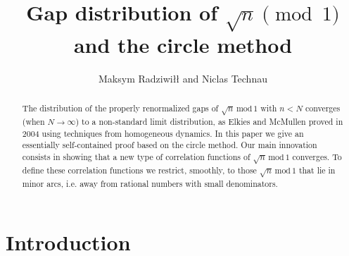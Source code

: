\documentclass[12pt,reqno]{amsart}
\theoremstyle{plain}
\numberwithin{equation}{section}
\numberwithin{figure}{section}
\theoremstyle{plain}
\theoremstyle{definition}
\theoremstyle{remark}
\newcommand{\mmod}{\,\mathrm{mod}\,}
\begin{document}
\title{Gap distribution of $\sqrt{n} \pmod {1}$ and the circle method}
 \author{Maksym Radziwi\l{}\l{} and Niclas Technau}


 \begin{abstract} 
  The distribution of the properly 
  renormalized gaps of 
  $\sqrt{n} \mmod{1}$ with $n < N$
  converges (when $N\rightarrow \infty$)
  to a non-standard limit distribution, 
  as Elkies and McMullen proved in 2004
  using techniques from homogeneous dynamics. 
  In this paper we give an essentially 
  self-contained proof based on the circle method. 
  Our main innovation
  consists in showing that a new
  type of correlation functions of 
  $\sqrt{n} \mmod{1}$
  converges. To define these 
  correlation functions we restrict,
  smoothly, to those 
  $\sqrt{n} \mmod{1}$ that lie in
  minor arcs, i.e. away from rational numbers with
  small denominators. %
\end{abstract}
 
 \maketitle
 

\section{Introduction}
\end{document}
